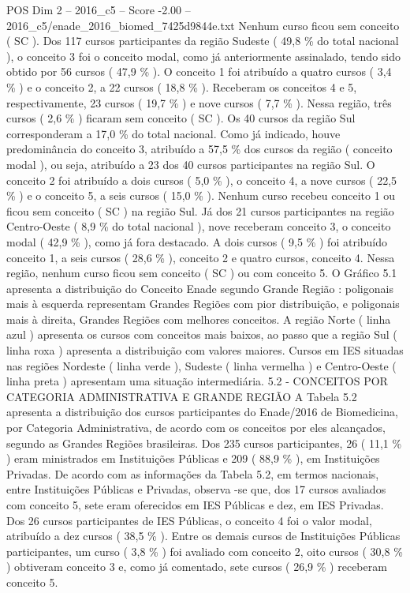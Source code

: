\begin{textsample}{POS Dim 2 – 2016\_c5 – Score -2.00 – 2016\_c5/enade\_2016\_biomed\_7425d9844e.txt}
Nenhum curso ficou sem conceito ( SC ).
Dos 117 cursos participantes da região Sudeste ( 49,8 \% do total nacional ), o conceito 3 foi o conceito modal, como já anteriormente assinalado, tendo sido obtido por 56 cursos ( 47,9 \% ).
O conceito 1 foi atribuído a quatro cursos ( 3,4 \% ) e o conceito 2, a 22 cursos ( 18,8 \% ).
Receberam os conceitos 4 e 5, respectivamente, 23 cursos ( 19,7 \% ) e nove cursos ( 7,7 \% ).
Nessa região, três cursos ( 2,6 \% ) ficaram sem conceito ( SC ).
Os 40 cursos da região Sul corresponderam a 17,0 \% do total nacional.
Como já indicado, houve predominância do conceito 3, atribuído a 57,5 \% dos cursos da região ( conceito modal ), ou seja, atribuído a 23 dos 40 cursos participantes na região Sul.
O conceito 2 foi atribuído a dois cursos ( 5,0 \% ), o conceito 4, a nove cursos ( 22,5 \% ) e o conceito 5, a seis cursos ( 15,0 \% ).
Nenhum curso recebeu conceito 1 ou ficou sem conceito ( SC ) na região Sul.
Já dos 21 cursos participantes na região Centro-Oeste ( 8,9 \% do total nacional ), nove receberam conceito 3, o conceito modal ( 42,9 \% ), como já fora destacado.
A dois cursos ( 9,5 \% ) foi atribuído conceito 1, a seis cursos ( 28,6 \% ), conceito 2 e quatro cursos, conceito 4.
Nessa região, nenhum curso ficou sem conceito ( SC ) ou com conceito 5.
O Gráfico 5.1 apresenta a distribuição do Conceito Enade segundo Grande Região : poligonais mais à esquerda representam Grandes Regiões com pior distribuição, e poligonais mais à direita, Grandes Regiões com melhores conceitos.
A região Norte ( linha azul ) apresenta os cursos com conceitos mais baixos, ao passo que a região Sul ( linha roxa ) apresenta a distribuição com valores maiores.
Cursos em IES situadas nas regiões Nordeste ( linha verde ), Sudeste ( linha vermelha ) e Centro-Oeste ( linha preta ) apresentam uma situação intermediária. 5.2 - CONCEITOS POR CATEGORIA ADMINISTRATIVA E GRANDE REGIÃO A Tabela 5.2 apresenta a distribuição dos cursos participantes do Enade/2016 de Biomedicina, por Categoria Administrativa, de acordo com os conceitos por eles alcançados, segundo as Grandes Regiões brasileiras.
Dos 235 cursos participantes, 26 ( 11,1 \% ) eram ministrados em Instituições Públicas e 209 ( 88,9 \% ), em Instituições Privadas.
De acordo com as informações da Tabela 5.2, em termos nacionais, entre Instituições Públicas e Privadas, observa -se que, dos 17 cursos avaliados com conceito 5, sete eram oferecidos em IES Públicas e dez, em IES Privadas.
Dos 26 cursos participantes de IES Públicas, o conceito 4 foi o valor modal, atribuído a dez cursos ( 38,5 \% ).
Entre os demais cursos de Instituições Públicas participantes, um curso ( 3,8 \% ) foi avaliado com conceito 2, oito cursos ( 30,8 \% ) obtiveram conceito 3 e, como já comentado, sete cursos ( 26,9 \% ) receberam conceito 5.

\end{textsample}
